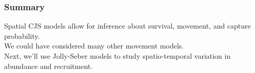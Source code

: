 \documentclass[color=usenames,dvipsnames]{beamer}\usepackage[]{graphicx}\usepackage[]{xcolor}
\begin{document}
\begin{frame}
  \frametitle{Summary}
  \large
  Spatial CJS models allow for inference about survival,
  movement, and capture probability. \\
  \pause \vfill
  We could have considered many other movement models. \\
  \pause \vfill
  Next, we'll use Jolly-Seber models to study spatio-temporal
  variation in abundance and recruitment. \\
\end{frame}



\end{document}
